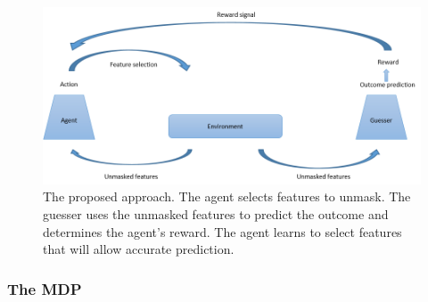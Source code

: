 \documentclass[reqno,11pt]{article}
\begin{document}
\begin{figure}[t]

  \centering
    \includegraphics[width=1.0\textwidth]{approach.png}  
    \caption{The proposed approach. The agent selects features to unmask. The guesser uses the unmasked features to predict the outcome and determines the agent's reward. The agent learns to select features that will allow accurate prediction.}
    \label{fig:1}
\end{figure}


\subsubsection {The MDP}\label{sec:mdp}
\end{document}
